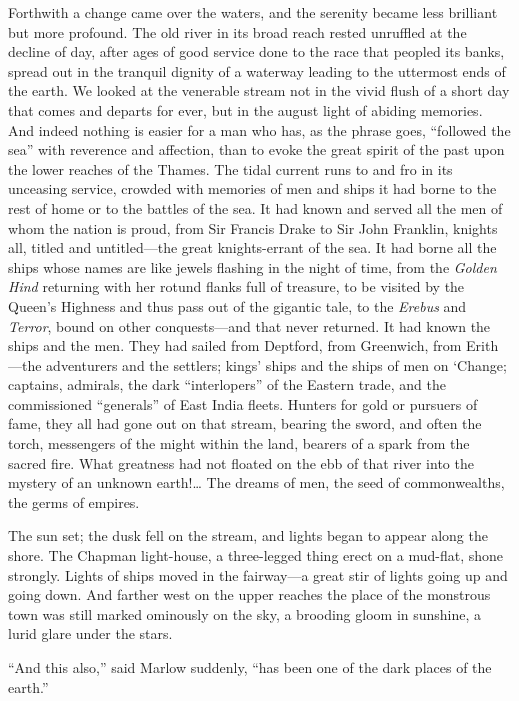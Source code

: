 \documentclass[12pt]{report}
\begin{document}
Forthwith a change came over the waters, and the serenity became less
brilliant but more profound. The old river in its broad reach rested
unruffled at the decline of day, after ages of good service done to the
race that peopled its banks, spread out in the tranquil dignity of a
waterway leading to the uttermost ends of the earth. We looked at the
venerable stream not in the vivid flush of a short day that comes and
departs for ever, but in the august light of abiding memories. And
indeed nothing is easier for a man who has, as the phrase goes,
``followed the sea'' with reverence and affection, than to evoke the
great spirit of the past upon the lower reaches of the Thames. The tidal
current runs to and fro in its unceasing service, crowded with memories
of men and ships it had borne to the rest of home or to the battles of
the sea. It had known and served all the men of whom the nation is
proud, from Sir Francis Drake to Sir John Franklin, knights all, titled
and untitled---the great knights-errant of the sea. It had borne all the
ships whose names are like jewels flashing in the night of time, from
the \emph{Golden Hind} returning with her rotund flanks full of
treasure, to be visited by the Queen's Highness and thus pass out of the
gigantic tale, to the \emph{Erebus} and \emph{Terror}, bound on other
conquests---and that never returned. It had known the ships and the men.
They had sailed from Deptford, from Greenwich, from Erith---the
adventurers and the settlers; kings' ships and the ships of men on
`Change; captains, admirals, the dark ``interlopers'' of the Eastern
trade, and the commissioned ``generals'' of East India fleets. Hunters
for gold or pursuers of fame, they all had gone out on that stream,
bearing the sword, and often the torch, messengers of the might within
the land, bearers of a spark from the sacred fire. What greatness had
not floated on the ebb of that river into the mystery of an unknown
earth!\ldots{} The dreams of men, the seed of commonwealths, the germs
of empires.

The sun set; the dusk fell on the stream, and lights began to appear
along the shore. The Chapman light-house, a three-legged thing erect on
a mud-flat, shone strongly. Lights of ships moved in the fairway---a
great stir of lights going up and going down. And farther west on the
upper reaches the place of the monstrous town was still marked ominously
on the sky, a brooding gloom in sunshine, a lurid glare under the stars.

``And this also,'' said Marlow suddenly, ``has been one of the dark
places of the earth.''
\end{document}
